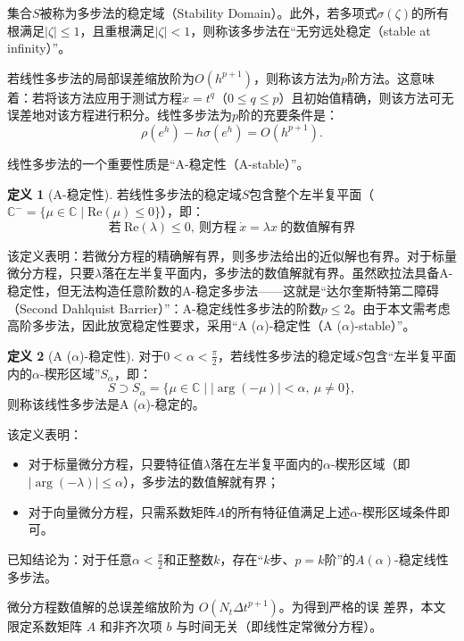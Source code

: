 \documentclass{article}
\theoremstyle{definition}
\newtheorem{definition}{定义}
\begin{document}
集合\(S\)被称为多步法的稳定域（Stability Domain）。此外，若多项式\(\sigma(\zeta)\)的所有根满足\(|\zeta| \leq 1\)，且重根满足\(|\zeta| < 1\)，则称该多步法在“无穷远处稳定（stable at infinity）”。

若线性多步法的局部误差缩放阶为\(O(h^{p+1})\)，则称该方法为\(p\)阶方法。这意味着：若将该方法应用于测试方程\(\dot{x} = t^q\)（\(0 \leq q \leq p\)）且初始值精确，则该方法可无误差地对该方程进行积分。线性多步法为\(p\)阶的充要条件是：
\[
\rho(e^h) - h \sigma(e^h) = O(h^{p+1}). 
\]

线性多步法的一个重要性质是“A-稳定性（A-stable）”。

\begin{definition}[A-稳定性]
若线性多步法的稳定域\(S\)包含整个左半复平面（\(\mathbb{C}^- = \{\mu \in \mathbb{C} \mid \text{Re}(\mu) \leq 0\}\)），即：
\[
\text{若}\ \text{Re}(\lambda) \leq 0,\ \text{则方程}\ \dot{x} = \lambda x\ \text{的数值解有界}
\]
\end{definition}

该定义表明：若微分方程的精确解有界，则多步法给出的近似解也有界。对于标量微分方程，只要\(\lambda\)落在左半复平面内，多步法的数值解就有界。虽然欧拉法具备A-稳定性，但无法构造任意阶数的A-稳定多步法——这就是“达尔奎斯特第二障碍（Second Dahlquist Barrier）”：A-稳定线性多步法的阶数\(p \leq 2\)。由于本文需考虑高阶多步法，因此放宽稳定性要求，采用“A (\(\alpha\))-稳定性（A (\(\alpha \))-stable）”。

\begin{definition}[A (\(\alpha \))-稳定性]
对于\(0 < \alpha < \frac{\pi}{2}\)，若线性多步法的稳定域\(S\)包含“左半复平面内的\(\alpha \)-楔形区域”\(S_\alpha\)，即：
\[
S \supset S_\alpha = \{\mu \in \mathbb{C} \mid |\arg(-\mu)| < \alpha,\ \mu \neq 0\}, 
\]
则称该线性多步法是A (\(\alpha \))-稳定的。
\end{definition}

该定义表明：
\begin{itemize}
    \item 对于标量微分方程，只要特征值\(\lambda\)落在左半复平面内的\(\alpha\)-楔形区域（即\(|\arg(-\lambda)| \leq \alpha\)），多步法的数值解就有界；
    \item 对于向量微分方程，只需系数矩阵\(A\)的所有特征值满足上述\(\alpha\)-楔形区域条件即可。
\end{itemize}

已知结论为：对于任意\(\alpha < \frac{\pi}{2}\)和正整数\(k\)，存在“\(k\)步、\(p=k\)阶”的\(A(\alpha)\)-稳定线性多步法。


微分方程数值解的总误差缩放阶为 \(O\left(N_t {\Delta t}^{p+1}\right)\)。为得到严格的误
差界，本文限定系数矩阵 \(A\) 和非齐次项 \(b\) 与时间无关（即线性定常微分方程）。
\end{document}
